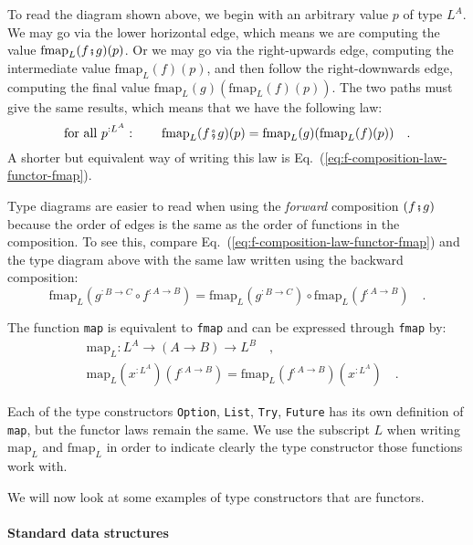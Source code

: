 To read the diagram shown above, we begin with an arbitrary value
$p$ of type $L^{A}$. We may go via the lower horizontal edge, which
means we are computing the value $\text{fmap}_{L}(f\bef g)(p)$. Or
we may go via the right-upwards edge, computing the intermediate value
$\text{fmap}_{L}(f)(p)$, and then follow the right-downwards edge,
computing the final value $\text{fmap}_{L}(g)(\text{fmap}_{L}(f)(p))$.
The two paths must give the same results, which means that we have
the following law:
\[
\text{for all }p^{:L^{A}}:\quad\quad\text{fmap}_{L}(f\bef g)(p)=\text{fmap}_{L}(g)(\text{fmap}_{L}(f)(p))\quad.
\]
A shorter but equivalent way of writing this law is Eq.~(\ref{eq:f-composition-law-functor-fmap}).

Type diagrams are easier to read when using the \emph{forward} composition
$\left(f\bef g\right)$ because the order of edges is the same as
the order of functions in the composition. To see this, compare Eq.~(\ref{eq:f-composition-law-functor-fmap})
and the type diagram above with the same law written using the backward
composition:
\[
\text{fmap}_{L}(g^{:B\rightarrow C}\circ f^{:A\rightarrow B})=\text{fmap}_{L}(g^{:B\rightarrow C})\circ\text{fmap}_{L}(f^{:A\rightarrow B})\quad.
\]

The function \lstinline!map! is equivalent to \lstinline!fmap! and
can be expressed through \lstinline!fmap! by:
\begin{align*}
 & \text{map}_{L}:L^{A}\rightarrow\left(A\rightarrow B\right)\rightarrow L^{B}\quad,\\
 & \text{map}_{L}(x^{:L^{A}})(f^{:A\rightarrow B})=\text{fmap}_{L}(f^{:A\rightarrow B})(x^{:L^{A}})\quad.
\end{align*}

Each of the type constructors \lstinline!Option!, \lstinline!List!,
\lstinline!Try!, \lstinline!Future! has its own definition of \lstinline!map!,
but the functor laws remain the same. We use the subscript $L$ when
writing $\text{map}_{L}$ and $\text{fmap}_{L}$ in order to indicate
clearly the type constructor those functions work with.

We will now look at some examples of type constructors that are functors.

\paragraph{Standard data structures}

